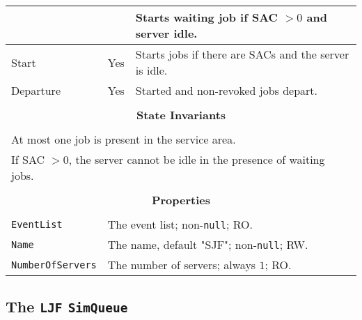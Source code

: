 \documentclass[12pt]{book}
\begin{document}
\begin{tabular}{|l|l|l|}
        &                       & Starts waiting job if SAC $> 0$ and server idle. \\
\hline
Start & Yes & Starts jobs if there are SACs and the server is idle. \\
\hline
Departure & Yes & Started and non-revoked jobs depart. \\
\hline
\multicolumn{3}{|c|}{} \\
\multicolumn{3}{|c|}{\bf State  Invariants} \\
\multicolumn{3}{|c|}{} \\
\hline
\multicolumn{3}{|l|}{At most one job is present in the service area.} \\
\multicolumn{3}{|l|}{If SAC $> 0$, the server cannot be idle in the presence of waiting jobs.} \\
\hline
\multicolumn{3}{|c|}{} \\
\multicolumn{3}{|c|}{\bf Properties} \\
\multicolumn{3}{|c|}{} \\
\hline
\lstinline|EventList|       & \multicolumn{2}{|l|}{The event list; non-\lstinline|null|; RO.} \\
\hline
\lstinline|Name|            & \multicolumn{2}{|l|}{The name, default "SJF"; non-\lstinline|null|; RW.} \\
\hline
\lstinline|NumberOfServers| & \multicolumn{2}{|l|}{The number of servers; always $1$; RO.} \\
\hline
\end{tabular}

\subsection{The \lstinline{LJF} \lstinline{SimQueue}}
 
\end{document}
